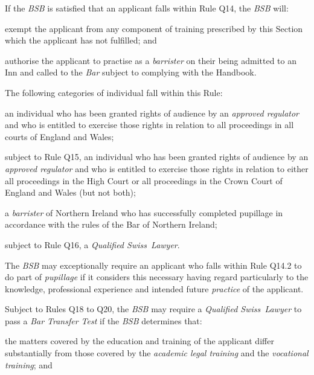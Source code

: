


If the \emph{BSB} is satisfied that an applicant falls within Rule Q14,
the \emph{BSB} will:

\nl  \item exempt the applicant from any component of training prescribed by
this Section which the applicant has not fulfilled; and

 \item authorise the applicant to practise as a \emph{barrister} on their
being admitted to an Inn and called to the \emph{Bar} subject to
complying with the Handbook.\ln


The following categories of individual fall within this Rule:

\nl  \item an individual who has been granted rights of audience by an
\emph{approved regulator} and who is entitled to exercise those rights
in relation to all proceedings in all courts of England and Wales;

 \item subject to Rule Q15, an individual who has been granted rights of
audience by an \emph{approved regulator} and who is entitled to exercise
those rights in relation to either all proceedings in the High Court or
all proceedings in the Crown Court of England and Wales (but not both);

 \item a \emph{barrister} of Northern Ireland who has successfully completed
pupillage in accordance with the rules of the Bar of Northern Ireland;

 \item subject to Rule Q16, a \emph{Qualified Swiss~Lawyer}.
\ln
{}

The \emph{BSB} may exceptionally require an applicant who falls within
Rule Q14.2 to do part of \emph{pupillage} if it considers this necessary
having regard particularly to the knowledge, professional experience and
intended future \emph{practice} of the applicant.


Subject to Rules Q18 to Q20, the \emph{BSB} may require a
\emph{Qualified Swiss~Lawyer} to pass a \emph{Bar Transfer Test} if the
\emph{BSB} determines that:

\nl  \item the matters covered by the education and training of the applicant
differ substantially from those covered by the \emph{academic legal
training} and the \emph{vocational training}; and


